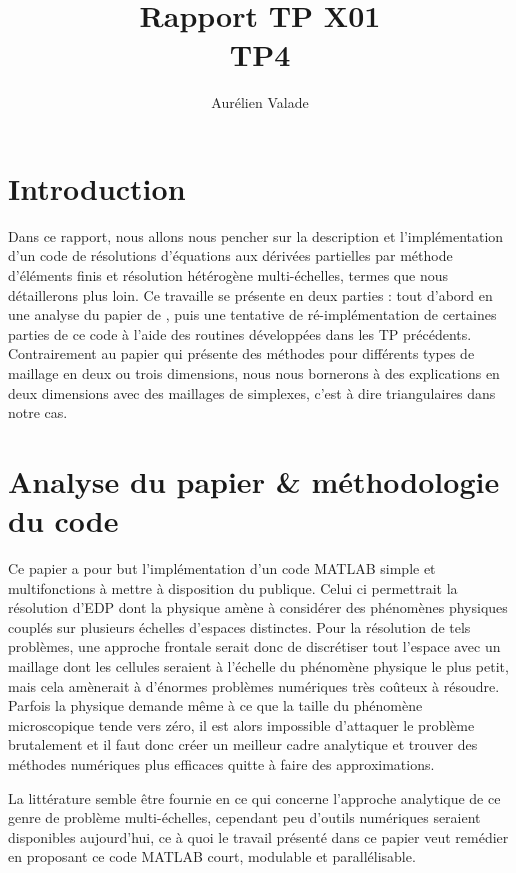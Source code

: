 \documentclass[11pt]{article}
\title{Rapport TP X01 \\ TP4}
\author{Aurélien Valade}
\date{}
\begin{document}
\maketitle

\section{Introduction}

Dans ce rapport, nous allons nous pencher sur la description et l'implémentation d'un code de résolutions d'équations aux dérivées partielles par méthode
d'éléments finis et résolution hétérogène multi-échelles, termes que nous détaillerons plus loin. Ce travaille se présente en deux parties : tout d'abord
en une analyse du papier de \cite{abdulle2009short}, puis une tentative de ré-implémentation de certaines parties de ce code à l'aide des routines développées
dans les TP précédents. Contrairement au papier qui présente des méthodes pour différents types de maillage en deux ou trois dimensions, nous nous
bornerons à des explications en deux dimensions avec des maillages de simplexes, c'est à dire triangulaires dans notre cas. 

\section{Analyse du papier \& méthodologie du code}

Ce papier a pour but l'implémentation d'un code MATLAB simple et multifonctions à mettre à disposition du publique. Celui ci permettrait la résolution
d'EDP dont la physique amène à considérer des phénomènes physiques couplés sur plusieurs échelles d'espaces distinctes. Pour la résolution de tels
problèmes, une approche frontale serait donc de discrétiser tout l'espace avec un maillage dont les cellules seraient à l'échelle du phénomène physique le
plus petit, mais cela amènerait à d'énormes problèmes numériques très coûteux à résoudre. Parfois la physique demande même à ce que la taille du phénomène
microscopique tende vers zéro, il est alors impossible d'attaquer le problème brutalement et il faut donc créer un meilleur cadre analytique et trouver
des méthodes numériques plus efficaces quitte à faire des approximations.

La littérature semble être fournie en ce qui concerne l'approche analytique de ce genre de problème multi-échelles, cependant peu d'outils numériques
seraient disponibles aujourd'hui, ce à quoi le travail présenté dans ce papier veut remédier en proposant ce code MATLAB court, modulable et parallélisable.
\end{document}
